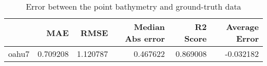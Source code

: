 \begin{table}[h!]
\caption{Error between the point bathymetry and ground-truth data}
\label{tab:oahu7_lidar_error}
\begin{tabular}{lrrrrr}
\toprule
 & MAE & RMSE & Median Abs error & R2 Score & Average Error \\
\midrule
oahu7 & 0.709208 & 1.120787 & 0.467622 & 0.869008 & -0.032182 \\
\bottomrule
\end{tabular}
\end{table}
